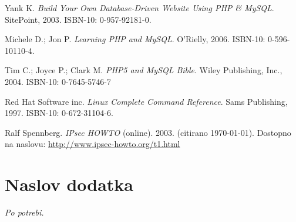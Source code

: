 \documentclass[a4paper,12pt]{report}
\begin{document}
\begin{thebibliography}{99}
\addtocounter{chapter}{1}

 Yank K. \emph{Build Your Own Database-Driven Website Using PHP \& MySQL}. SitePoint, 2003. ISBN-10: 0-957-92181-0.

 Michele D.; Jon P. \emph{Learning PHP and MySQL}. O'Rielly, 2006. ISBN-10: 0-596-10110-4.

 Tim C.; Joyce P.; Clark M. \emph{PHP5 and MySQL Bible}. Wiley Publishing, Inc., 2004. ISBN-10: 0-7645-5746-7

 Red Hat Software inc. \emph{Linux Complete Command Reference}. Sams Publishing, 1997. ISBN-10: 0-672-31104-6.

 Ralf Spennberg. \emph{IPsec HOWTO} (online). 2003. (citirano \today). Dostopno na naslovu:
\url{http://www.ipsec-howto.org/t1.html}

\end{thebibliography}


 \appendix

\chapter{Naslov dodatka}
{\it Po potrebi.}
\end{document}
